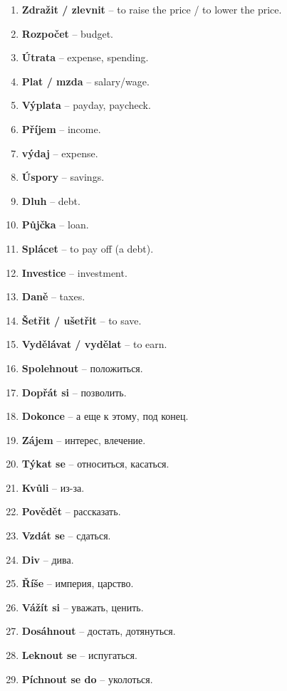 \documentclass[12pt]{book}
\begin{document}
\begin{enumerate}
    \item \textbf{Zdražit / zlevnit} -- to raise the price / to lower the price.
    \item \textbf{Rozpočet} -- budget.
    \item \textbf{Útrata} -- expense, spending.
    \item \textbf{Plat / mzda} -- salary/wage.
    \item \textbf{Výplata} -- payday, paycheck.
    \item \textbf{Příjem} -- income.
    \item \textbf{výdaj} -- expense.
    \item \textbf{Úspory} -- savings.
    \item \textbf{Dluh} -- debt.
    \item \textbf{Půjčka} -- loan.
    \item \textbf{Splácet} -- to pay off (a debt).
    \item \textbf{Investice} -- investment.
    \item \textbf{Daně} -- taxes.
    \item \textbf{Šetřit / ušetřit} -- to save.
    \item \textbf{Vydělávat / vydělat} -- to earn.
    \item \textbf{Spolehnout} -- \textrussian{положиться}.
    \item \textbf{Dopřát si} -- \textrussian{позволить}.
    \item \textbf{Dokonce} -- \textrussian{а еще к этому, под конец}.
    \item \textbf{Zájem} -- \textrussian{интерес, влечение}.
    \item \textbf{Týkat se} -- \textrussian{относиться, касаться}.
    \item \textbf{Kvůli} -- \textrussian{из-за}.
    \item \textbf{Povědět} -- \textrussian{рассказать}.
    \item \textbf{Vzdát se} -- \textrussian{сдаться}.
    \item \textbf{Div} -- \textrussian{дива}.
    \item \textbf{Říše} -- \textrussian{империя, царство}.
    \item \textbf{Vážít si} -- \textrussian{уважать, ценить}.
    \item \textbf{Dosáhnout} -- \textrussian{достать, дотянуться}.
    \item \textbf{Leknout se} -- \textrussian{испугаться}.
    \item \textbf{Píchnout se do} -- \textrussian{уколоться}.

\end{enumerate}
\end{document}
